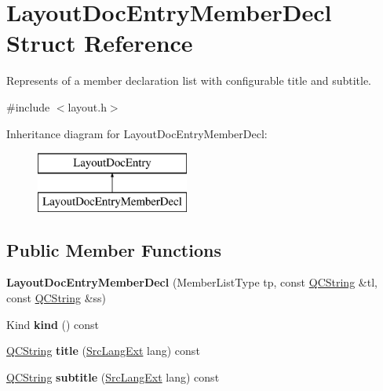 \hypertarget{struct_layout_doc_entry_member_decl}{}\section{Layout\+Doc\+Entry\+Member\+Decl Struct Reference}
\label{struct_layout_doc_entry_member_decl}


Represents of a member declaration list with configurable title and subtitle.  




{\ttfamily \#include $<$layout.\+h$>$}

Inheritance diagram for Layout\+Doc\+Entry\+Member\+Decl\+:\begin{figure}[H]
\begin{center}
\leavevmode
\includegraphics[height=2.000000cm]{struct_layout_doc_entry_member_decl}
\end{center}
\end{figure}
\subsection*{Public Member Functions}
\begin{DoxyCompactItemize}
\item 
\mbox{\label{struct_layout_doc_entry_member_decl_a10fad7cf84e33c32c4db54d26d5ed26f}} 
{\bfseries Layout\+Doc\+Entry\+Member\+Decl} (Member\+List\+Type tp, const \mbox{\hyperlink{class_q_c_string}{Q\+C\+String}} \&tl, const \mbox{\hyperlink{class_q_c_string}{Q\+C\+String}} \&ss)
\item 
\mbox{\label{struct_layout_doc_entry_member_decl_ae4bc970e938122f32a0a1e46ec1f8379}} 
Kind {\bfseries kind} () const
\item 
\mbox{\label{struct_layout_doc_entry_member_decl_a20f84bd3015b092b218ec7eb7f66897e}} 
\mbox{\hyperlink{class_q_c_string}{Q\+C\+String}} {\bfseries title} (\mbox{\hyperlink{types_8h_a9974623ce72fc23df5d64426b9178bf2}{Src\+Lang\+Ext}} lang) const
\item 
\mbox{\label{struct_layout_doc_entry_member_decl_ac0d8d0be507c58dd5c3fe02fd986369b}} 
\mbox{\hyperlink{class_q_c_string}{Q\+C\+String}} {\bfseries subtitle} (\mbox{\hyperlink{types_8h_a9974623ce72fc23df5d64426b9178bf2}{Src\+Lang\+Ext}} lang) const
\end{DoxyCompactItemize}
